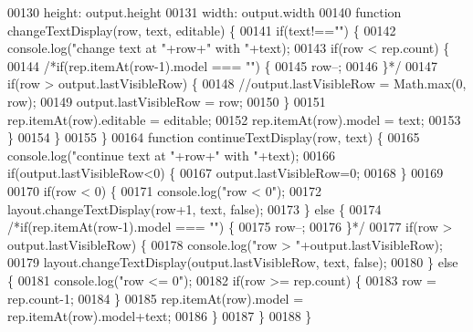 \begin{DoxyCode}
00130         height: output.height
00131         width: output.width
00140         \textcolor{keyword}{function} changeTextDisplay(row, text, editable) \{
00141             \textcolor{keywordflow}{if}(text!==\textcolor{stringliteral}{""}) \{
00142                 console.log(\textcolor{stringliteral}{"change text at "}+row+\textcolor{stringliteral}{" with "}+text);
00143                 \textcolor{keywordflow}{if}(row < rep.count) \{
00144                     \textcolor{comment}{/*if(rep.itemAt(row-1).model === "") \{}
00145 \textcolor{comment}{                    row--;}
00146 \textcolor{comment}{                \}*/}
00147                     \textcolor{keywordflow}{if}(row > output.lastVisibleRow) \{
00148                         \textcolor{comment}{//output.lastVisibleRow = Math.max(0, row);}
00149                         output.lastVisibleRow = row;
00150                     \}
00151                     rep.itemAt(row).editable = editable;
00152                     rep.itemAt(row).model = text;
00153                 \}
00154             \}
00155         \}
00164         \textcolor{keyword}{function} continueTextDisplay(row, text) \{
00165             console.log(\textcolor{stringliteral}{"continue text at "}+row+\textcolor{stringliteral}{" with "}+text);
00166             \textcolor{keywordflow}{if}(output.lastVisibleRow<0) \{
00167                 output.lastVisibleRow=0;
00168             \}
00169 
00170             \textcolor{keywordflow}{if}(row < 0) \{
00171                 console.log(\textcolor{stringliteral}{"row < 0"});
00172                 layout.changeTextDisplay(row+1, text, \textcolor{keyword}{false});
00173             \} \textcolor{keywordflow}{else} \{
00174                 \textcolor{comment}{/*if(rep.itemAt(row-1).model === "") \{}
00175 \textcolor{comment}{                    row--;}
00176 \textcolor{comment}{                \}*/}
00177                 \textcolor{keywordflow}{if}(row > output.lastVisibleRow) \{
00178                     console.log(\textcolor{stringliteral}{"row > "}+output.lastVisibleRow);
00179                     layout.changeTextDisplay(output.lastVisibleRow, text, \textcolor{keyword}{false});
00180                 \} \textcolor{keywordflow}{else} \{
00181                     console.log(\textcolor{stringliteral}{"row <= 0"});
00182                     \textcolor{keywordflow}{if}(row >= rep.count) \{
00183                         row = rep.count-1;
00184                     \}
00185                     rep.itemAt(row).model = rep.itemAt(row).model+text;
00186                 \}
00187             \}
00188         \}

\end{DoxyCode}
